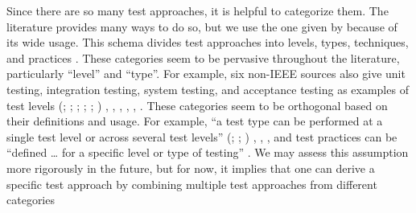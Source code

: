 Since there are so many test approaches, it is helpful to categorize them.
The literature provides many ways to do so, but we use the one given by
\ifnotpaper\else \citeauthor{IEEE2022} \fi \citet{IEEE2022} because of its wide usage.
This schema divides test approaches into levels, types, techniques, and practices
\citeyearpar[Fig.~2; see ]{IEEE2022}. These categories seem
to be pervasive throughout the literature, particularly ``level'' and ``type''.
\label{nonIEEE-sources}%
For example, six non-IEEE sources also give unit testing, integration testing,
system testing, and acceptance testing as examples of test levels \ifnotpaper
    (\citealp[pp.~5\=/6 to 5\=/7]{SWEBOK2024}; \citealpISTQB{};
    \citealp[pp.~807\==808]{Perry2006}; \citealp[pp.~443\==445]{PetersAndPedrycz2000};
    \citealp[p.~218]{KuļešovsEtAl2013};
    \citealp[pp.~9, 13]{Gerrard2000a})\else
    \cite[pp.~443\==445]{PetersAndPedrycz2000},
    \cite[pp.~5\=/6 to 5\=/7]{SWEBOK2024}, \cite{ISTQB},
    \cite[pp.~807\==808]{Perry2006}, \cite[pp.~9, 13]{Gerrard2000a},
    \cite[p.~218]{KuļešovsEtAl2013}\fi.\label{orth-approach}
These categories seem to be orthogonal based on their definitions and usage.
For example, ``a test type can be performed at a single test level or across
several test levels'' \ifnotpaper (\citealp[p.~15]{IEEE2022};
    \citeyear[p.~8]{IEEE2021a}; \citeyear[p.~7]{IEEE2021c})\else
    \cite[p.~15]{IEEE2022}, \cite[p.~7]{IEEE2021c}, \cite[p.~8]{IEEE2021a}\fi,
and test practices can be ``defined \dots{} for a specific level or type of
testing'' \citeyearpar[p.~9]{IEEE2021b}.
We may assess this assumption more rigorously in the future, but for now, it
implies that one can derive a specific test approach by combining multiple
test approaches from different categories\ifnotpaper
